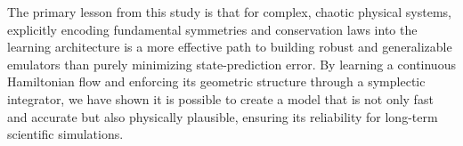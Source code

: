 \documentclass[]{article}
\begin{document}
The primary lesson from this study is that for complex, chaotic physical systems, explicitly encoding fundamental symmetries and conservation laws into the learning architecture is a more effective path to building robust and generalizable emulators than purely minimizing state-prediction error. By learning a continuous Hamiltonian flow and enforcing its geometric structure through a symplectic integrator, we have shown it is possible to create a model that is not only fast and accurate but also physically plausible, ensuring its reliability for long-term scientific simulations.


{}

\end{document}
